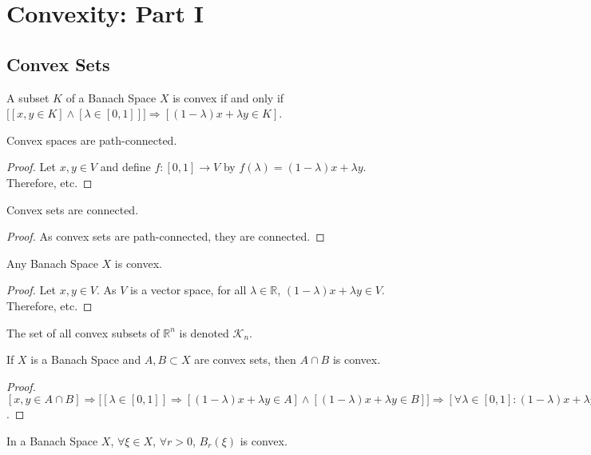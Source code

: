
\section{Convexity: Part I}
    \subsection{Convex Sets}
        \begin{definition}
        A subset $K$ of a Banach Space $X$ is convex if and only if $\big[[x,y\in K]\land  [\lambda \in [0,1]]\big]\Rightarrow[(1-\lambda)x+\lambda y\in K]$.
        \end{definition}
        \begin{theorem}
        Convex spaces are path-connected.
        \end{theorem}
        \begin{proof}
        Let $x,y\in V$ and define $f:[0,1]\rightarrow V$ by $f(\lambda) = (1-\lambda)x+\lambda y$. Therefore, etc.
        \end{proof}
        \begin{theorem}
        Convex sets are connected.
        \end{theorem}
        \begin{proof}
        As convex sets are path-connected, they are connected.
        \end{proof}
        \begin{theorem}
        Any Banach Space $X$ is convex.
        \end{theorem}
        \begin{proof}
        Let $x,y\in V$. As $V$ is a vector space, for all $\lambda \in \mathbb{R}$, $(1-\lambda)x+\lambda y\in V$. Therefore, etc.
        \end{proof}
        The set of all convex subsets of $\mathbb{R}^n$ is denoted $\mathscr{K}_n$.
        \begin{theorem}
        If $X$ is a Banach Space and $A,B\subset X$ are convex sets, then $A\cap B$ is convex.
        \end{theorem}
        \begin{proof}
        $[x,y \in A\cap B] \Rightarrow \big[[\lambda \in [0,1]]\Rightarrow[ (1-\lambda)x+\lambda y \in A]\land [ (1-\lambda)x+\lambda y \in B]\big] \Rightarrow [\forall \lambda \in [0,1]:(1-\lambda)x+\lambda y \in A\cap B]$. 
        \end{proof}
        \begin{theorem}
        In a Banach Space $X$, $\forall \xi \in X$, $\forall r>0$, $B_{r}(\xi)$ is convex.
        \end{theorem}
